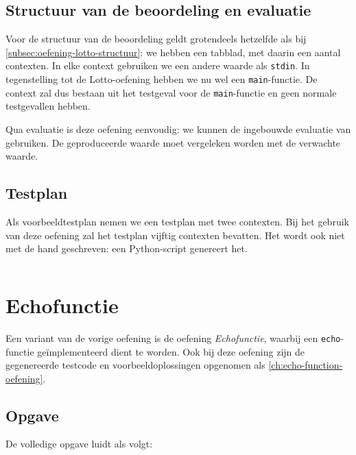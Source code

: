 \subsection{Structuur van de beoordeling en evaluatie}\label{subsec:oefening-echo-structuur}

Voor de structuur van de beoordeling geldt grotendeels hetzelfde als bij \cref{subsec:oefening-lotto-structuur}: we hebben een tabblad, met daarin een aantal contexten.
In elke context gebruiken we een andere waarde als \texttt{stdin}.
In tegenstelling tot de Lotto-oefening hebben we nu wel een \texttt{main}-functie.
De context zal dus bestaan uit het testgeval voor de \texttt{main}-functie en geen normale testgevallen hebben.

Qua evaluatie is deze oefening eenvoudig: we kunnen de ingebouwde evaluatie van \tested{} gebruiken.
De geproduceerde waarde moet vergeleken worden met de verwachte waarde.

\subsection{Testplan}\label{subsec:oefening-echo-testplan}

Als voorbeeldtestplan nemen we een testplan met twee contexten.
Bij het gebruik van deze oefening zal het testplan vijftig contexten bevatten.
Het wordt ook niet met de hand geschreven: een Python-script genereert het.

\inputminted{json}{sources/echo/two.tson}

\section{Echofunctie}\label{sec:oefening-echofunctie}

Een variant van de vorige oefening is de oefening \emph{Echofunctie}, waarbij een \texttt{echo}-functie geïmplementeerd dient te worden.
Ook bij deze oefening zijn de gegenereerde testcode en voorbeeldoplossingen opgenomen als \cref{ch:echo-function-oefening}.

\subsection{Opgave}\label{subsec:oefening-echofunctie-opgave}

De volledige opgave luidt als volgt:

\begin{quote}
\end{quote}

